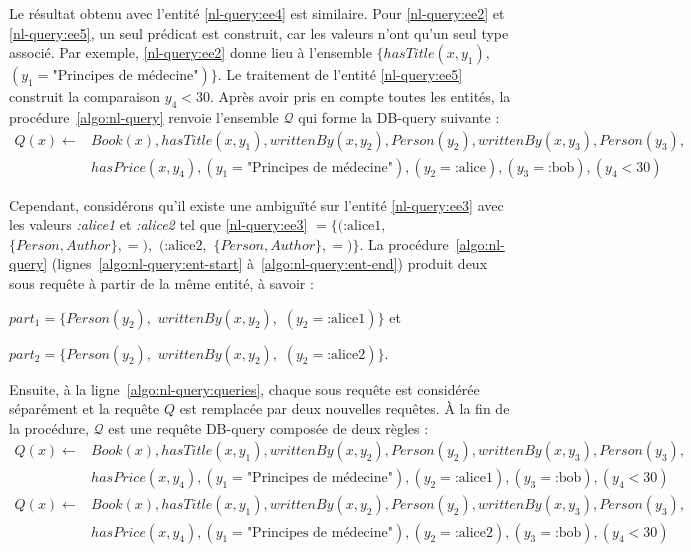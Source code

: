 Le résultat obtenu avec l'entité \ref{nl-query:ee4} est similaire.
Pour \ref{nl-query:ee2} et \ref{nl-query:ee5}, un seul prédicat est construit, car les valeurs n'ont qu'un seul type associé.
Par exemple, \ref{nl-query:ee2} donne lieu à l'ensemble $\{ hasTitle(x, y_1),$ $(y_1 = \text{"Principes de médecine"}) \}$.
Le traitement de l'entité \ref{nl-query:ee5} construit la comparaison $y_4 < 30$.
Après avoir pris en compte toutes les entités, la procédure~\ref{algo:nl-query} renvoie l'ensemble $\mathcal{Q}$ qui forme la DB-query suivante :
\begin{equation*}
    \begin{split}
        Q(x) \leftarrow & Book(x), hasTitle(x, y_1), writtenBy(x, y_2), Person(y_2), writtenBy(x, y_3), Person(y_3),                      \\
                        & hasPrice(x, y_4), (y_1 = \text{"Principes de médecine"}), (y_2= \text{:alice}), (y_3 = \text{:bob}), (y_4 < 30)
    \end{split}
\end{equation*}

Cependant, considérons qu'il existe une ambiguïté sur l'entité \ref{nl-query:ee3} avec les valeurs \emph{:alice1} et \emph{:alice2} tel que \ref{nl-query:ee3} $= \{(\text{:alice1},$ $\{Person, Author\}, =),$ $(\text{:alice2},$ $\{Person, Author\}, =)\}$.
La procédure~\ref{algo:nl-query} (lignes~\ref{algo:nl-query:ent-start} à~\ref{algo:nl-query:ent-end}) produit deux sous requête à partir de la même entité, à savoir :
\begin{enumerate*}[label=(\roman*)]
    \item $part_1 = \{ Person(y_2),$ $writtenBy(x, y_2),$ $(y_2 = \text{:alice1}) \}$ et
    \item $part_2 = \{ Person(y_2),$ $writtenBy(x, y_2),$ $(y_2 = \text{:alice2}) \}$.
\end{enumerate*}
Ensuite, à la ligne~\ref{algo:nl-query:queries}, chaque sous requête est considérée séparément et la requête $Q$ est remplacée par deux nouvelles requêtes.
À la fin de la procédure, $\mathcal{Q}$ est une requête DB-query composée de deux règles :
\begin{equation*}
    \begin{split}
        Q(x) \leftarrow & Book(x), hasTitle(x, y_1), writtenBy(x, y_2), Person(y_2), writtenBy(x, y_3), Person(y_3),                       \\
                        & hasPrice(x, y_4), (y_1 = \text{"Principes de médecine"}), (y_2= \text{:alice1}), (y_3 = \text{:bob}), (y_4 < 30) \\
        Q(x) \leftarrow & Book(x), hasTitle(x, y_1), writtenBy(x, y_2), Person(y_2), writtenBy(x, y_3), Person(y_3),                       \\
                        & hasPrice(x, y_4), (y_1 = \text{"Principes de médecine"}), (y_2= \text{:alice2}), (y_3 = \text{:bob}), (y_4 < 30)
    \end{split}
\end{equation*}

